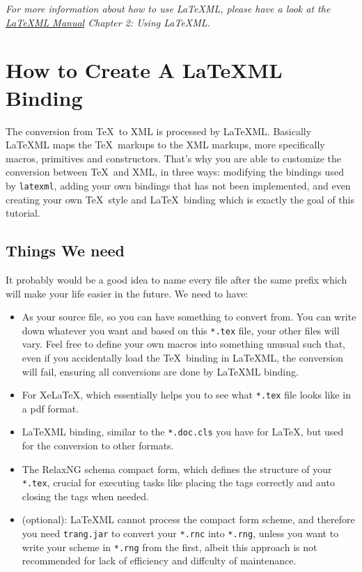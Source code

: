 \documentclass{article}
\begin{document}
\begin{tcolorbox}
\emph{For more information about how to use \LaTeX ML, please have a look at the \href{http://dlmf.nist.gov/LaTeXML/manual.pdf}{\LaTeX ML Manual} Chapter 2: Using \LaTeX ML.}
\end{tcolorbox}

\section{How to Create A LaTeXML Binding}
The conversion from \TeX\  to XML is processed by \LaTeX ML. Basically \LaTeX ML maps the \TeX \ markups to the XML markups, more specifically macros, primitives and constructors. That's why you are able to customize the conversion between \TeX\  and XML, in three ways: modifying the bindings used by \texttt{latexml}, adding your own bindings that has not been implemented, and even creating your own \TeX \ style and \LaTeX\  binding which is exactly the goal of this tutorial.
\subsection{Things We need}
It probably would be a good idea to name every file after the same prefix which will make your life easier in the future. We need to have:
\begin{itemize}
\item[\texttt{*.tex}] As your source file, so you can have something to convert from. You can write down whatever you want and based on this \texttt{*.tex} file, your other files will vary. Feel free to define your own macros into something unusual such that, even if you accidentally load the \TeX\ binding in \LaTeX ML, the conversion will fail, ensuring all conversions are done by \LaTeX ML binding. \\

\item[\texttt{*.cls}] For Xe\LaTeX, which essentially helps you to see what \texttt{*.tex} file looks like in a pdf format. \\ 

\item[\texttt{*.cls.ltxml}] \LaTeX ML binding, similar to the \texttt{*.doc.cls} you have for \LaTeX, but used for the conversion to other formats. \\

\item[\texttt{*.rnc}] The RelaxNG schema compact form, which defines the structure of your \texttt{*.tex}, crucial for executing tasks like placing the tags correctly and auto closing the tags when needed. \\

\item[\texttt{trang.jar}](optional): \LaTeX ML cannot process the compact form scheme, and therefore you need \texttt{trang.jar} to convert your \texttt{*.rnc} into \texttt{*.rng}, unless you want to write your scheme in \texttt{*.rng} from the first, albeit this approach is not recommended for lack of efficiency and diffculty of maintenance.
\end{itemize}
\end{document}
